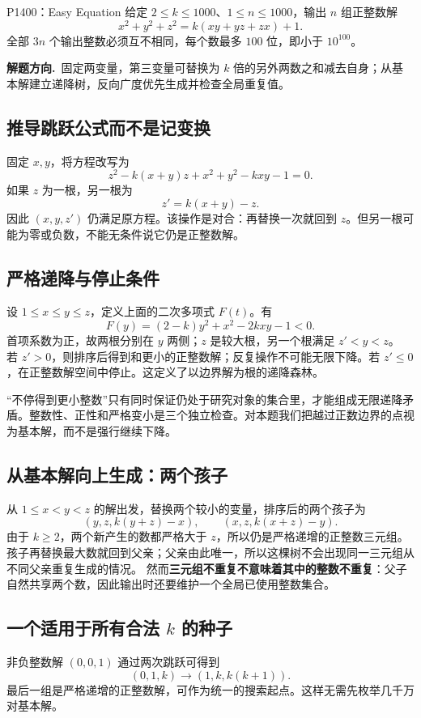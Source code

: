 \documentclass[UTF8,a4paper,11pt,oneside,openany,fontset=fandol]{ctexbook}
\theoremstyle{definition}
\newcommand{\hint}{\par\noindent\textbf{解题方向.}\ }
\begin{document}
\begin{problem}{P1400：Easy Equation}
给定 $2\le k\le1000$、$1\le n\le1000$，输出 $n$ 组正整数解
\[
 x^2+y^2+z^2=k(xy+yz+zx)+1.
\]
全部 $3n$ 个输出整数必须互不相同，每个数最多 $100$ 位，即小于 $10^{100}$。
\end{problem}
\hint 固定两变量，第三变量可替换为 $k$ 倍的另外两数之和减去自身；从基本解建立递降树，反向广度优先生成并检查全局重复值。


\subsection{推导跳跃公式而不是记变换}
固定 $x,y$，将方程改写为
\[
 z^2-k(x+y)z+x^2+y^2-kxy-1=0.
\]
如果 $z$ 为一根，另一根为
\[
 z'=k(x+y)-z.
\]
因此 $(x,y,z')$ 仍满足原方程。该操作是对合：再替换一次就回到 $z$。但另一根可能为零或负数，不能无条件说它仍是正整数解。

\subsection{严格递降与停止条件}
设 $1\le x\le y\le z$，定义上面的二次多项式 $F(t)$。有
\[
 F(y)=(2-k)y^2+x^2-2kxy-1<0.
\]
首项系数为正，故两根分别在 $y$ 两侧；$z$ 是较大根，另一个根满足 $z'<y<z$。
若 $z'>0$，则排序后得到和更小的正整数解；反复操作不可能无限下降。若 $z'\le0$，在正整数解空间中停止。这定义了以边界解为根的递降森林。

\begin{pitfall}
“不停得到更小整数”只有同时保证仍处于研究对象的集合里，才能组成无限递降矛盾。整数性、正性和严格变小是三个独立检查。对本题我们把越过正数边界的点视为基本解，而不是强行继续下降。
\end{pitfall}

\subsection{从基本解向上生成：两个孩子}
从 $1\le x<y<z$ 的解出发，替换两个较小的变量，排序后的两个孩子为
\[
 (y,z,k(y+z)-x),\qquad (x,z,k(x+z)-y).
\]
由于 $k\ge2$，两个新产生的数都严格大于 $z$，所以仍是严格递增的正整数三元组。孩子再替换最大数就回到父亲；父亲由此唯一，所以这棵树不会出现同一三元组从不同父亲重复生成的情况。
然而\textbf{三元组不重复不意味着其中的整数不重复}：父子自然共享两个数，因此输出时还要维护一个全局已使用整数集合。

\subsection{一个适用于所有合法 \texorpdfstring{$k$}{k} 的种子}
非负整数解 $(0,0,1)$ 通过两次跳跃可得到
\[
 (0,1,k)\longrightarrow(1,k,k(k+1)).
\]
最后一组是严格递增的正整数解，可作为统一的搜索起点。这样无需先枚举几千万对基本解。
\end{document}
